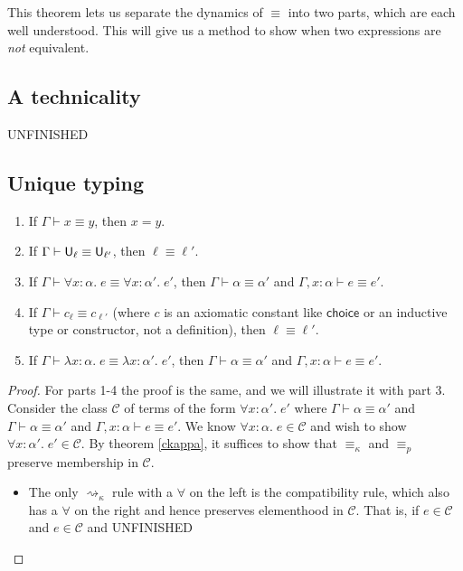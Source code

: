 This theorem lets us separate the dynamics of $\equiv$ into two parts, which are each well understood. This will give us a method to show when two expressions are \emph{not} equivalent.

\subsection{A technicality}\label{technical}
UNFINISHED
\subsection{Unique typing}

\begin{lemma}
\begin{enumerate}
\item If $\Gamma\vdash x\equiv y$, then $x=y$.
\item If $\Gamma\vdash \U_\ell\equiv\U_{\ell'}$, then $\ell\equiv\ell'$.
\item If $\Gamma\vdash \forall x:\alpha.\;e\equiv\forall x:\alpha'.\;e'$, then $\Gamma\vdash \alpha\equiv\alpha'$ and $\Gamma,x:\alpha\vdash e\equiv e'$.
\item If $\Gamma\vdash c_{\ell}\equiv c_{\ell'}$ (where $c$ is an axiomatic constant like $\mathsf{choice}$ or an inductive type or constructor, not a definition), then $\ell\equiv\ell'$.
\item If $\Gamma\vdash \lambda x:\alpha.\;e\equiv\lambda x:\alpha'.\;e'$, then $\Gamma\vdash \alpha\equiv\alpha'$ and $\Gamma,x:\alpha\vdash e\equiv e'$.
\end{enumerate}
\end{lemma}
\begin{proof}
For parts 1-4 the proof is the same, and we will illustrate it with part 3. Consider the class $\mathcal{C}$ of terms of the form $\forall x:\alpha'.\;e'$ where $\Gamma\vdash\alpha\equiv\alpha'$ and $\Gamma\vdash \alpha\equiv\alpha'$ and $\Gamma,x:\alpha\vdash e\equiv e'$. We know $\forall x:\alpha.\;e\in\mathcal{C}$ and wish to show $\forall x:\alpha'.\;e'\in\mathcal{C}$. By theorem \ref{ckappa}, it suffices to show that $\equiv_\kappa$ and $\equiv_p$ preserve membership in $\mathcal{C}$.
\begin{itemize}
\item The only $\rightsquigarrow_\kappa$ rule with a $\forall$ on the left is the compatibility rule, which also has a $\forall$ on the right and hence preserves elementhood in $\mathcal{C}$. That is, if $e\in\mathcal{C}$ and $e\in\mathcal{C}$ and UNFINISHED
\end{itemize}
\end{proof}

